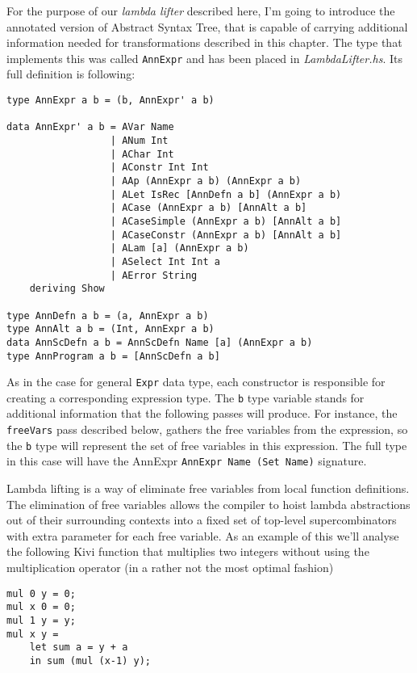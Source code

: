 \documentclass[12pt,a4paper]{report}
\begin{document}
For the purpose of our \textit{lambda lifter} described here, I'm going to
introduce the annotated version of Abstract Syntax Tree, that is capable of
carrying additional information needed for transformations described in this
chapter. The type that implements this was called \texttt{AnnExpr} and has
been placed in \textit{LambdaLifter.hs}. Its full definition is following:

\hspace*{-1.5in}
\begin{lstlisting}[style=haskell,label=lst:annotated_expression]
type AnnExpr a b = (b, AnnExpr' a b)

data AnnExpr' a b = AVar Name
                  | ANum Int
                  | AChar Int
                  | AConstr Int Int
                  | AAp (AnnExpr a b) (AnnExpr a b)
                  | ALet IsRec [AnnDefn a b] (AnnExpr a b)
                  | ACase (AnnExpr a b) [AnnAlt a b]
                  | ACaseSimple (AnnExpr a b) [AnnAlt a b]
                  | ACaseConstr (AnnExpr a b) [AnnAlt a b]
                  | ALam [a] (AnnExpr a b)
                  | ASelect Int Int a
                  | AError String
    deriving Show

type AnnDefn a b = (a, AnnExpr a b)
type AnnAlt a b = (Int, AnnExpr a b)
data AnnScDefn a b = AnnScDefn Name [a] (AnnExpr a b)
type AnnProgram a b = [AnnScDefn a b]
\end{lstlisting}

As in the case for general \texttt{Expr} data type, each constructor is
responsible for creating a corresponding expression type. The \texttt{b} type
variable stands for additional information that the following passes will
produce. For instance, the \texttt{freeVars} pass described below, gathers the
free variables from the expression, so the \texttt{b} type will represent the
set of free variables in this expression. The full type in this case will have
the AnnExpr \texttt{AnnExpr Name (Set Name)} signature.

Lambda lifting is a way of eliminate free variables from local function
definitions. The elimination of free variables allows the compiler to hoist
lambda abstractions out of their surrounding contexts into a fixed set of
top-level supercombinators with extra parameter for each free variable. As an
example of this we'll analyse the following Kivi function that multiplies two
integers without using the multiplication operator (in a rather not the most
optimal fashion)

\hspace*{-1.5in}
\begin{lstlisting}[style=haskell]
mul 0 y = 0;
mul x 0 = 0;
mul 1 y = y;
mul x y =
    let sum a = y + a
    in sum (mul (x-1) y);
\end{lstlisting}
\end{document}
